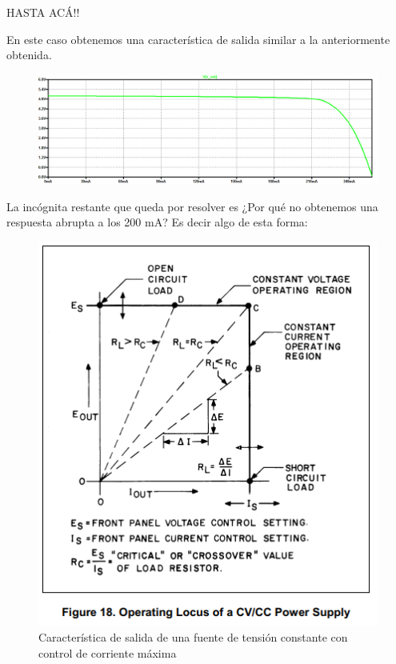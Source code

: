 HASTA ACÁ!!

En este caso obtenemos una característica de salida similar a la anteriormente obtenida.
\begin{figure}[H]
	\centering
	\includegraphics[width=0.8\linewidth]{ImagenesEjercicio1/CaracteristicaDeSalidaConGrillaFL}
	\caption{}
	\label{fig:caracteristicadesalidacongrillafl}
\end{figure}

La incógnita restante que queda por resolver es ¿Por qué no obtenemos una respuesta abrupta a los 200 mA?
Es decir algo de esta forma:
\begin{figure}[H]
	\centering
	\includegraphics[scale=0.7]{ImagenesEjercicio1/CVCC}
	\caption{Característica de salida de una fuente de tensión constante con control de corriente máxima}
	\label{fig:cvcc}
\end{figure}


